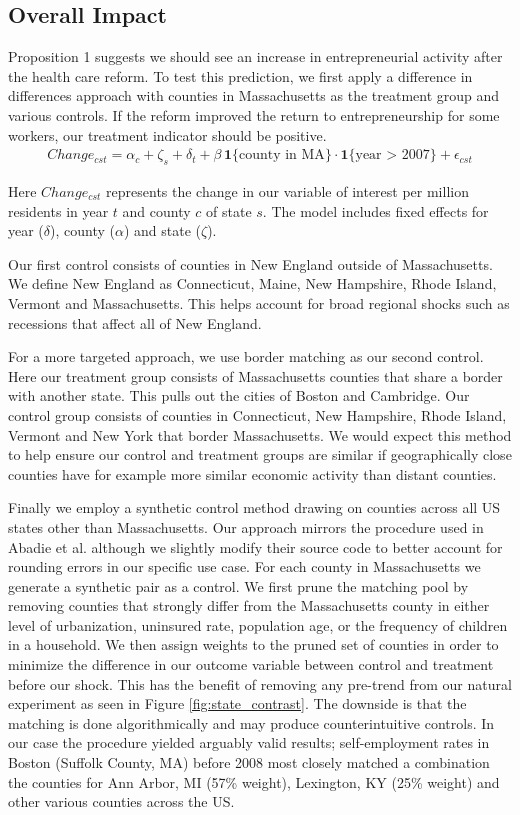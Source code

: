 \documentclass[12pt]{article}
\begin{document}
\subsection{Overall Impact}

Proposition 1 suggests we should see an increase in entrepreneurial activity after the health care reform. To test this prediction, we first apply a difference in differences approach with counties in Massachusetts as the treatment group and various controls. If the reform improved the return to entrepreneurship for some workers, our treatment indicator should be positive. 
\begin{align}
Change_{cst} = \alpha_c + \zeta_s + \delta_t + \beta \, \mathbf{1}\{\text{county in MA}\} \cdot \mathbf{1}\{\text{year > 2007}\} + \epsilon_{cst}
\end{align}

Here $Change_{cst}$ represents the change in our variable of interest per million residents in year $t$ and county $c$ of state $s$. The model includes fixed effects for year ($\delta$), county ($\alpha$) and state ($\zeta$).

Our first control consists of counties in New England outside of Massachusetts. We define New England as Connecticut, Maine, New Hampshire, Rhode Island, Vermont and Massachusetts. This helps account for broad regional shocks such as recessions that affect all of New England. 

For a more targeted approach, we use border matching as our second control. Here our treatment group consists of Massachusetts counties that share a border with another state. This pulls out the cities of Boston and Cambridge. Our control group consists of counties in Connecticut, New Hampshire, Rhode Island, Vermont and New York that border Massachusetts. We would expect this method to help ensure our control and treatment groups are similar if geographically close counties  have for example more similar economic activity than distant counties. 

Finally we employ a synthetic control method drawing on counties across all US states other than Massachusetts. Our approach mirrors the procedure used in Abadie et al. \cite{abadie} although we slightly modify their source code to better account for rounding errors in our specific use case. For each county in Massachusetts we generate a synthetic pair as a control. We first prune the matching pool by removing counties that strongly differ from the Massachusetts county in either level of urbanization, uninsured rate, population age, or the frequency of children in a household. We then assign weights to the pruned set of counties in order to minimize the difference in our outcome variable between control and treatment before our shock. This has the benefit of removing any pre-trend from our natural experiment as seen in Figure \ref{fig:state_contrast}. The downside is that the matching is done algorithmically and may produce counterintuitive controls. In our case the procedure yielded arguably valid results; self-employment rates in Boston (Suffolk County, MA) before 2008 most closely matched a combination the counties for Ann Arbor, MI (57\% weight), Lexington, KY (25\% weight) and other various counties across the US. 
\end{document}
